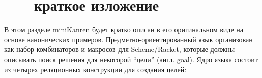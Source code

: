 
\section{\miniKanren~--- краткое изложение}
\label{sec:demo}

В этом разделе miniKanren будет кратко описан в его оригинальном виде на основе канонических примеров.
Предметно-ориентированный язык организован как набор комбинаторов и макросов для Scheme/Racket, которые должны описывать поиск решения для некоторой \enquote{цели} (англ. goal).
Ядро языка состоит из четырех реляционных конструкции для создания целей:

